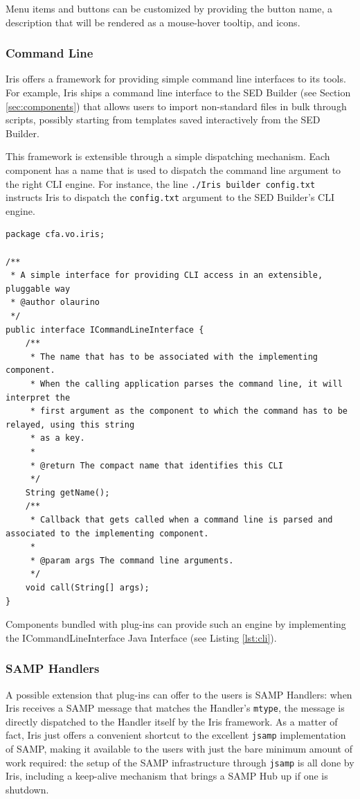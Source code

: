 \documentclass[5p]{elsarticle}
\begin{document}
Menu items and buttons can be customized by providing the button name, a description that will be rendered as a mouse-hover tooltip, and icons.

\subsubsection{Command Line}
Iris offers a framework for providing simple command line interfaces to its tools. For example, Iris ships a command line interface to the SED Builder (see Section \ref{sec:components}) that allows users to import non-standard files in bulk through scripts, possibly starting from templates saved interactively from the SED Builder.

This framework is extensible through a simple dispatching mechanism. Each component has a name that is used to dispatch the command line argument to the right CLI engine. For instance, the line \verb|./Iris builder config.txt| instructs Iris to dispatch the \verb|config.txt| argument to the SED Builder's CLI engine.


\begin{lstlisting}[style=java,
	caption={Every Iris component can expose a command line interface. Iris dispatches the command line arguments for the relative component to process.},
	label=lst:cli]
package cfa.vo.iris;

/**
 * A simple interface for providing CLI access in an extensible, pluggable way
 * @author olaurino
 */
public interface ICommandLineInterface {
    /**
     * The name that has to be associated with the implementing component.
     * When the calling application parses the command line, it will interpret the
     * first argument as the component to which the command has to be relayed, using this string
     * as a key.
     *
     * @return The compact name that identifies this CLI
     */
    String getName();
    /**
     * Callback that gets called when a command line is parsed and associated to the implementing component.
     *
     * @param args The command line arguments.
     */
    void call(String[] args);
}
\end{lstlisting}


Components bundled with plug-ins can provide such an engine by implementing the ICommandLineInterface Java Interface (see Listing \ref{lst:cli}).

\subsubsection{SAMP Handlers}
A possible extension that plug-ins can offer to the users is SAMP Handlers: when Iris receives a SAMP message that matches the Handler's \verb|mtype|, the message is directly dispatched to the Handler itself by the Iris framework. As a matter of fact, Iris just offers a convenient shortcut to the excellent \verb|jsamp| implementation of SAMP, making it available to the users with just the bare minimum amount of work required: the setup of the SAMP infrastructure through \verb|jsamp| is all done by Iris, including a keep-alive mechanism that brings a SAMP Hub up if one is shutdown.
\end{document}

